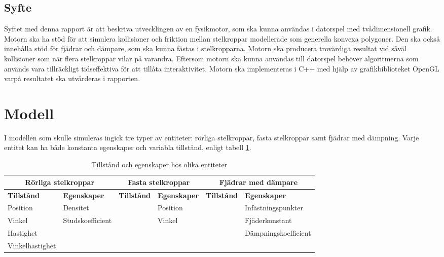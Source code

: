 \documentclass[a4paper,12pt,twopage,swedish]{article}
\begin{document}
\subsection{Syfte}
Syftet med denna rapport är att beskriva utvecklingen av en fysikmotor, som ska kunna användas i datorspel med tvådimensionell grafik. Motorn ska ha stöd för att simulera kollisioner och friktion mellan stelkroppar modellerade som generella konvexa polygoner. Den ska också innehålla stöd för fjädrar och dämpare, som ska kunna fästas i stelkropparna. Motorn ska producera trovärdiga resultat vid såväl kollisioner som när flera stelkroppar vilar på varandra. Eftersom motorn ska kunna användas till datorspel behöver algoritmerna som används vara tillräckligt tidseffektiva för att tillåta interaktivitet. Motorn ska implementeras i C++ med hjälp av grafikbiblioteket OpenGL varpå resultatet ska utvärderas i rapporten.


\section{Modell}
I modellen som skulle simuleras ingick tre typer av entiteter: rörliga stelkroppar, fasta stelkroppar samt fjädrar med dämpning. Varje entitet kan ha både konstanta egenskaper och variabla tillstånd, enligt tabell \ref{table:states_and_properties}.

\begin{table}[!h]
	\caption{Tillstånd och egenskaper hos olika entiteter}
	\label{table:states_and_properties}
	\renewcommand{\arraystretch}{1.5}
	\begin{tabular}{|p{2.2cm}|p{2.3cm}|p{2.2cm}|p{2.3cm}|p{2.2cm}|p{2.3cm}|}
		\hline
			\multicolumn{2}{|c|}{\textbf{Rörliga stelkroppar}} & \multicolumn{2}{|c|}{\textbf{Fasta stelkroppar}} & \multicolumn{2}{|c|}{\textbf{Fjädrar med dämpare}} \\
		\hline
			\textbf{Tillstånd} & \textbf{Egenskaper} & \textbf{Tillstånd} & \textbf{Egenskaper} & \textbf{Tillstånd} & \textbf{Egenskaper} \\
		\hline
			Position & Densitet & & Position & & Infästnings\-punkter \\
			Vinkel & Studs\-koefficient & & Vinkel & & Fjäder\-konstant \\
			Hastighet & & & & & Dämpnings\-koefficient \\
			Vinkel\-hastighet & & & & & {} \\
		\hline
	\end{tabular}
\end{table}
\end{document}
